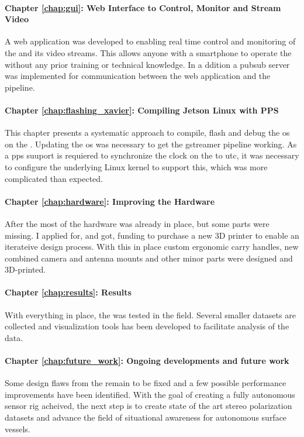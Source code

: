 \paragraph{Chapter \ref{chap:gui}: Web Interface to Control, Monitor and Stream Video}
A web application was developed to enabling real time control and monitoring of the \sr and its video streams.
This allows anyone with a smartphone to operate the \sr without any prior training or technical knowledge.
In a ddition a \gls{pubsub} server was implemented for communication between the web application and the pipeline.

\paragraph{Chapter \ref{chap:flashing_xavier}: Compiling Jetson Linux with PPS}
This chapter presents a systematic approach to compile, flash and debug the \gls{os} on the \jx.
Updating the \gls{os} was necessary to get the \gls{gstreamer} pipeline working.
As a \gls{pps} suuport is requiered  to synchronize the clock on the \jx to \gls{utc}, it was necessary to configure the underlying Linux kernel to support this, which was more complicated than expected.

\paragraph{Chapter \ref{chap:hardware}: Improving the Hardware}
After the \preproject most of the hardware was already in place, but some parts were missing.
I applied for, and got, funding to purchase a new 3D printer to enable an iterateive design process.
With this in place custom ergonomic carry handles, new combined camera and antenna mounts and other minor parts were designed and 3D-printed.

\paragraph{Chapter \ref{chap:results}: Results}
With everything in place, the \sr was tested in the field.
Several smaller datasets are collected and visualization tools has been developed to facilitate analysis of the data.

\paragraph{Chapter \ref{chap:future_work}: Ongoing developments and future work}
Some design flaws from the \preproject remain to be fixed and a few possible performance improvements have been identified.
With the goal of creating a fully autonomous sensor rig acheived, the next step is to create state of the art stereo polarization datasets and advance the field of situational awareness for autonomous surface vessels.

